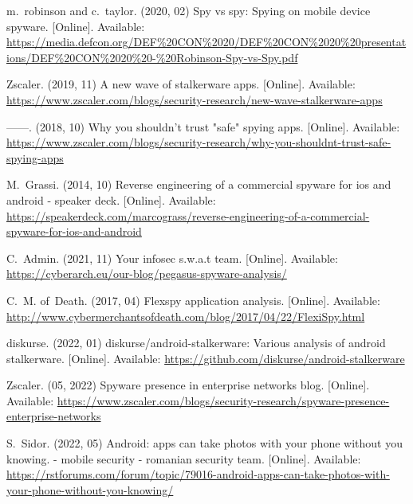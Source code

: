\documentclass[sigconf,balance=false]{acmart}
\begin{document}
\begin{thebibliography}{100}
\BIBentryALTinterwordspacing
m.~robinson and c.~taylor. (2020, 02) Spy vs spy: Spying on mobile device
  spyware. [Online]. Available:
  \url{https://media.defcon.org/DEF%20CON%2020/DEF%20CON%2020%20presentations/DEF%20CON%2020%20-%20Robinson-Spy-vs-Spy.pdf}
\BIBentrySTDinterwordspacing

\BIBentryALTinterwordspacing
Zscaler. (2019, 11) A new wave of stalkerware apps. [Online]. Available:
  \url{https://www.zscaler.com/blogs/security-research/new-wave-stalkerware-apps}
\BIBentrySTDinterwordspacing

\BIBentryALTinterwordspacing
------. (2018, 10) Why you shouldn't trust "safe" spying apps. [Online].
  Available:
  \url{https://www.zscaler.com/blogs/security-research/why-you-shouldnt-trust-safe-spying-apps}
\BIBentrySTDinterwordspacing

\BIBentryALTinterwordspacing
M.~Grassi. (2014, 10) Reverse engineering of a commercial spyware for ios and
  android - speaker deck. [Online]. Available:
  \url{https://speakerdeck.com/marcograss/reverse-engineering-of-a-commercial-spyware-for-ios-and-android}
\BIBentrySTDinterwordspacing

\BIBentryALTinterwordspacing
C.~Admin. (2021, 11) Your infosec s.w.a.t team. [Online]. Available:
  \url{https://cyberarch.eu/our-blog/pegasus-spyware-analysis/}
\BIBentrySTDinterwordspacing

\BIBentryALTinterwordspacing
C.~M. of~Death. (2017, 04) Flexspy application analysis. [Online]. Available:
  \url{http://www.cybermerchantsofdeath.com/blog/2017/04/22/FlexiSpy.html}
\BIBentrySTDinterwordspacing

\BIBentryALTinterwordspacing
diskurse. (2022, 01) diskurse/android-stalkerware: Various analysis of android
  stalkerware. [Online]. Available:
  \url{https://github.com/diskurse/android-stalkerware}
\BIBentrySTDinterwordspacing

\BIBentryALTinterwordspacing
Zscaler. (05, 2022) Spyware presence in enterprise networks blog. [Online].
  Available:
  \url{https://www.zscaler.com/blogs/security-research/spyware-presence-enterprise-networks}
\BIBentrySTDinterwordspacing

\BIBentryALTinterwordspacing
S.~Sidor. (2022, 05) Android: apps can take photos with your phone without you
  knowing. - mobile security - romanian security team. [Online]. Available:
  \url{https://rstforums.com/forum/topic/79016-android-apps-can-take-photos-with-your-phone-without-you-knowing/}
\BIBentrySTDinterwordspacing


\end{thebibliography}
\end{document}
